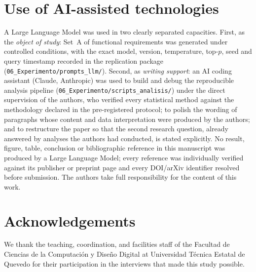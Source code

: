 \documentclass{llncs}
\begin{document}
\section*{Use of AI-assisted technologies}
A Large Language Model was used in two clearly separated capacities. First, as the
\emph{object of study}: Set~A of functional requirements was generated under
controlled conditions, with the exact model, version, temperature, top-$p$, seed and
query timestamp recorded in the replication package
(\texttt{06\_Experimento/prompts\_llm/}). Second, as \emph{writing support}: an AI
coding assistant (Claude, Anthropic) was used to build and debug the reproducible
analysis pipeline (\texttt{06\_Experimento/scripts\_analisis/}) under the direct
supervision of the authors, who verified every statistical method against the
methodology declared in the pre-registered protocol; to polish the wording of
paragraphs whose content and data interpretation were produced by the authors; and to
restructure the paper so that the second research question, already answered by analyses
the authors had conducted, is stated explicitly. No
result, figure, table, conclusion or bibliographic reference in this manuscript was
produced by a Large Language Model; every reference was individually verified against
its publisher or preprint page and every DOI/arXiv identifier resolved before
submission. The authors take full responsibility for the content of this work.

\section*{Acknowledgements}
We thank the teaching, coordination, and facilities staff of the Facultad de Ciencias
de la Computaci\'on y Dise\~no Digital at Universidad T\'ecnica Estatal de Quevedo for
their participation in the interviews that made this study possible.



\end{document}
